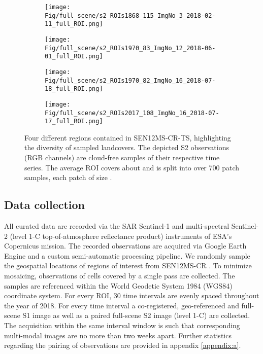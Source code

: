 \documentclass[journal]{IEEEtran}
\begin{document}
\begin{figure*}[h!tb]
  \centering
  \begin{subfigure}[b]{0.49\linewidth}
    \texttt{[image: Fig/full\_scene/s2\_ROIs1868\_115\_ImgNo\_3\_2018-02-11\_full\_ROI.png]}
  \end{subfigure}
    \begin{subfigure}[b]{0.49\linewidth}
    \texttt{[image: Fig/full\_scene/s2\_ROIs1970\_83\_ImgNo\_12\_2018-06-01\_full\_ROI.png]}
  \end{subfigure}
  \label{fig:coffee}
  \begin{subfigure}[b]{0.49\linewidth}
    \texttt{[image: Fig/full\_scene/s2\_ROIs1970\_82\_ImgNo\_16\_2018-07-18\_full\_ROI.png]}
  \end{subfigure}
    \begin{subfigure}[b]{0.49\linewidth}
    \texttt{[image: Fig/full\_scene/s2\_ROIs2017\_108\_ImgNo\_16\_2018-07-17\_full\_ROI.png]}
  \end{subfigure}
  \caption{Four different regions contained in SEN12MS-CR-TS, highlighting the diversity of sampled landcovers. The depicted S2 observations (RGB channels) are cloud-free samples of their respective time series. The average ROI covers about   and is split into over 700 patch samples, each patch of size .}
  \label{fig:diverseROI}
\end{figure*}

\subsection{Data collection} \label{curation}

All curated data are recorded via the SAR Sentinel-1 and multi-spectral Sentinel-2 (level 1-C top-of-atmosphere reflectance product) instruments of ESA's Copernicus mission. The recorded observations are acquired via Google Earth Engine \cite{gorelick2017google} and a custom semi-automatic processing pipeline. We randomly sample the geospatial locations of  regions of interest from SEN12MS-CR \cite{ebel2020multisensor}. To minimize mosaicing, observations of cells covered by a single pass are collected. The samples are referenced within the World Geodetic System 1984 (WGS84) coordinate system. For every ROI, 30 time intervals are evenly spaced throughout the year of 2018. For every time interval a co-registered, geo-referenced and full-scene S1 image as well as a paired full-scene S2 image (level 1-C) are collected. The acquisition within the same interval window is such that corresponding multi-modal images are no more than two weeks apart. Further statistics regarding the pairing of observations are provided in appendix \ref{appendix:a}.
\end{document}
